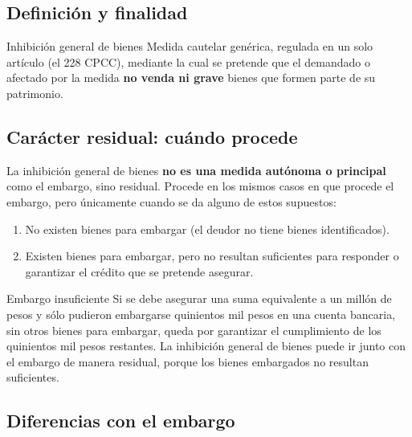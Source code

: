 \documentclass[12pt,oneside]{book}
\begin{document}
\subsection{Definición y finalidad}

\begin{definition}{Inhibición general de bienes}
Medida cautelar genérica, regulada en un solo artículo (el 228 CPCC), mediante la cual se pretende que el demandado o afectado por la medida \textbf{no venda ni grave} bienes que formen parte de su patrimonio.
\end{definition}

\subsection{Carácter residual: cuándo procede}

La inhibición general de bienes \textbf{no es una medida autónoma o principal} como el embargo, sino residual. Procede en los mismos casos en que procede el embargo, pero únicamente cuando se da alguno de estos supuestos:

\begin{enumerate}
    \item No existen bienes para embargar (el deudor no tiene bienes identificados).
    \item Existen bienes para embargar, pero no resultan suficientes para responder o garantizar el crédito que se pretende asegurar.
\end{enumerate}

\begin{example}{Embargo insuficiente}
Si se debe asegurar una suma equivalente a un millón de pesos y sólo pudieron embargarse quinientos mil pesos en una cuenta bancaria, sin otros bienes para embargar, queda por garantizar el cumplimiento de los quinientos mil pesos restantes. La inhibición general de bienes puede ir junto con el embargo de manera residual, porque los bienes embargados no resultan suficientes.
\end{example}

\subsection{Diferencias con el embargo}
\end{document}
